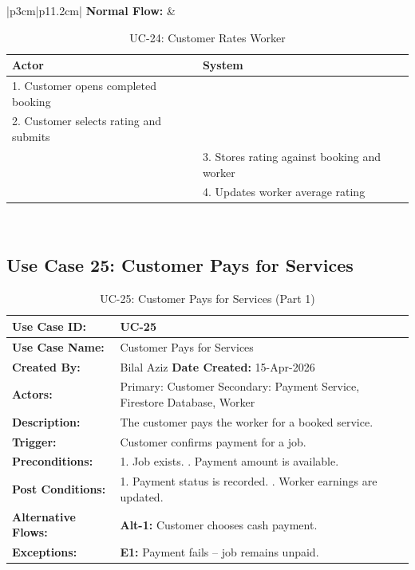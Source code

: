 \newpage

{\small
\renewcommand{\arraystretch}{1.05}
\begin{table}[H]
\centering
\begin{tabular}{|p{3cm}|p{11.2cm}|}
\hline
\textbf{Normal Flow:} &
\begin{tabular}[t]{|p{5.4cm}|p{5.4cm}|}
\hline
\textbf{Actor} & \textbf{System} \\ \hline
1. Customer opens completed booking & \\ \hline
2. Customer selects rating and submits & \\ \hline
 & 3. Stores rating against booking and worker \\ \hline
 & 4. Updates worker average rating \\ \hline
\end{tabular} \\ \hline
\end{tabular}
\caption{UC-24: Customer Rates Worker}
\end{table}
}

\newpage

\subsection*{Use Case 25: Customer Pays for Services}

{\small
\renewcommand{\arraystretch}{1.05}
\begin{table}[H]
\centering
\begin{tabular}{|p{3cm}|p{11.2cm}|}
\hline
\textbf{Use Case ID:} & UC-25 \\ \hline
\textbf{Use Case Name:} & Customer Pays for Services \\ \hline
\textbf{Created By:} & Bilal Aziz \hfill \textbf{Date Created:} 15-Apr-2026 \\ \hline
\textbf{Actors:} & Primary: Customer \quad Secondary: Payment Service, Firestore Database, Worker \\ \hline
\textbf{Description:} & The customer pays the worker for a booked service. \\ \hline
\textbf{Trigger:} & Customer confirms payment for a job. \\ \hline
\textbf{Preconditions:} & 1. Job exists. \newline 2. Payment amount is available. \\ \hline
\textbf{Post Conditions:} & 1. Payment status is recorded. \newline 2. Worker earnings are updated. \\ \hline
\textbf{Alternative Flows:} & \textbf{Alt-1:} Customer chooses cash payment. \\ \hline
\textbf{Exceptions:} & \textbf{E1:} Payment fails -- job remains unpaid. \\ \hline
\end{tabular}
\caption*{UC-25: Customer Pays for Services (Part 1)}
\end{table}
}


